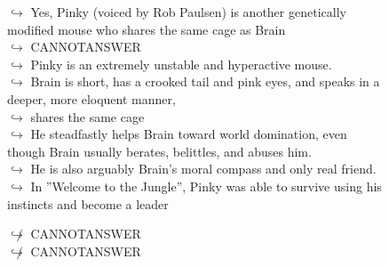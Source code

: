 \documentclass[11pt,a4paper, onecolumn]{article}
\begin{document}
\begin{figure}[t] \small \begin{tcolorbox}[boxsep=0pt,left=5pt,right=0pt,top=2pt,colback = yellow!5] \begin{dialogue}
 \small 
\colorbox{pink!25}{$\hookrightarrow$}
\colorbox{red!25}{Yes,}
{ Pinky (voiced by Rob Paulsen) is another genetically modified mouse who shares the same cage as Brain }
\\
\colorbox{pink!25}{$\hookrightarrow$}
{ CANNOTANSWER }
\\
\colorbox{pink!25}{$\hookrightarrow$}
{ Pinky is an extremely unstable and hyperactive mouse. }
\\
\colorbox{pink!25}{$\hookrightarrow$}
{ Brain is short, has a crooked tail and pink eyes, and speaks in a deeper, more eloquent manner, }
\\
\colorbox{pink!25}{$\hookrightarrow$}
{ shares the same cage }
\\
\colorbox{pink!25}{$\hookrightarrow$}
{ He steadfastly helps Brain toward world domination, even though Brain usually berates, belittles, and abuses him. }
\\
\colorbox{pink!25}{$\hookrightarrow$}
{ He is also arguably Brain's moral compass and only real friend. }
\\
\colorbox{pink!25}{$\hookrightarrow$}
{ In ''Welcome to the Jungle'', Pinky was able to survive using his instincts and become a leader }
 \end{dialogue}\end{tcolorbox}\end{figure}\begin{figure}[t] \small \begin{tcolorbox}[boxsep=0pt,left=5pt,right=0pt,top=2pt,colback = yellow!5] \begin{dialogue}
 \small 
\colorbox{pink!25}{$\not\hookrightarrow$}
{ CANNOTANSWER }
\\
\colorbox{pink!25}{$\not\hookrightarrow$}
{ CANNOTANSWER }
\\
 \end{dialogue}\end{tcolorbox}\end{figure}
\end{document}
